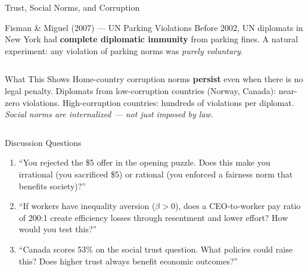 \documentclass[aspectratio=169]{beamer}
\begin{document}
\begin{frame}{Trust, Social Norms, and Corruption}
\begin{block}{Fisman \& Miguel (2007) --- UN Parking Violations}
Before 2002, UN diplomats in New York had \textbf{complete diplomatic immunity} from parking fines. A natural experiment: any violation of parking norms was \textit{purely voluntary}.
\end{block}
\begin{columns}
\begin{exampleblock}{What This Shows}
Home-country corruption norms \textbf{persist} even when there is no legal penalty. Diplomats from low-corruption countries (Norway, Canada): near-zero violations. High-corruption countries: hundreds of violations per diplomat. \textit{Social norms are internalized --- not just imposed by law.}
\end{exampleblock}
\end{columns}
\end{frame}

\begin{frame}{Discussion Questions}
\begin{enumerate}
  \item[\textcolor{bepurple}{Q1.}] ``You rejected the \$5 offer in the opening puzzle. Does this make you irrational (you sacrificed \$5) or rational (you enforced a fairness norm that benefits society)?''
  \medskip
  \item[\textcolor{beteal}{Q2.}] ``If workers have inequality aversion ($\beta > 0$), does a CEO-to-worker pay ratio of 200:1 create efficiency losses through resentment and lower effort? How would you test this?''
  \medskip
  \item[\textcolor{berust}{Q3.}] ``Canada scores 53\% on the social trust question. What policies could raise this? Does higher trust always benefit economic outcomes?''
\end{enumerate}
\end{frame}
\end{document}
